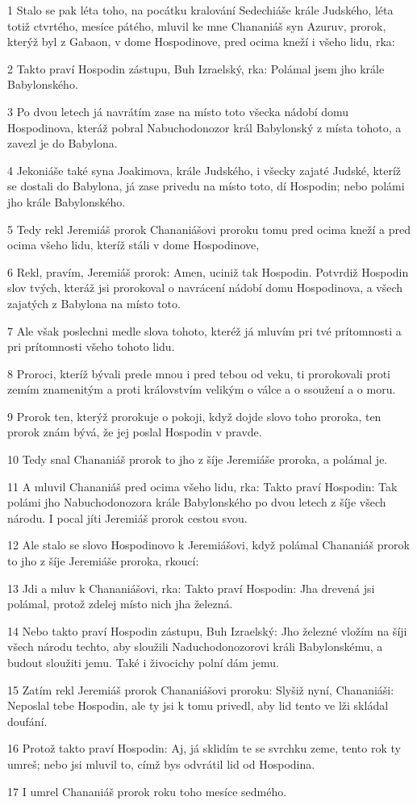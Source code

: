 \par 1 Stalo se pak léta toho, na pocátku kralování Sedechiáše krále Judského, léta totiž ctvrtého, mesíce pátého, mluvil ke mne Chananiáš syn Azuruv, prorok, kterýž byl z Gabaon, v dome Hospodinove, pred ocima kneží i všeho lidu, rka:
\par 2 Takto praví Hospodin zástupu, Buh Izraelský, rka: Polámal jsem jho krále Babylonského.
\par 3 Po dvou letech já navrátím zase na místo toto všecka nádobí domu Hospodinova, kteráž pobral Nabuchodonozor král Babylonský z místa tohoto, a zavezl je do Babylona.
\par 4 Jekoniáše také syna Joakimova, krále Judského, i všecky zajaté Judské, kteríž se dostali do Babylona, já zase privedu na místo toto, dí Hospodin; nebo polámi jho krále Babylonského.
\par 5 Tedy rekl Jeremiáš prorok Chananiášovi proroku tomu pred ocima kneží a pred ocima všeho lidu, kteríž stáli v dome Hospodinove,
\par 6 Rekl, pravím, Jeremiáš prorok: Amen, uciniž tak Hospodin. Potvrdiž Hospodin slov tvých, kteráž jsi prorokoval o navrácení nádobí domu Hospodinova, a všech zajatých z Babylona na místo toto.
\par 7 Ale však poslechni medle slova tohoto, kteréž já mluvím pri tvé prítomnosti a pri prítomnosti všeho tohoto lidu.
\par 8 Proroci, kteríž bývali prede mnou i pred tebou od veku, ti prorokovali proti zemím znamenitým a proti královstvím velikým o válce a o ssoužení a o moru.
\par 9 Prorok ten, kterýž prorokuje o pokoji, když dojde slovo toho proroka, ten prorok znám bývá, že jej poslal Hospodin v pravde.
\par 10 Tedy snal Chananiáš prorok to jho z šíje Jeremiáše proroka, a polámal je.
\par 11 A mluvil Chananiáš pred ocima všeho lidu, rka: Takto praví Hospodin: Tak polámi jho Nabuchodonozora krále Babylonského po dvou letech z šíje všech národu. I pocal jíti Jeremiáš prorok cestou svou.
\par 12 Ale stalo se slovo Hospodinovo k Jeremiášovi, když polámal Chananiáš prorok to jho z šíje Jeremiáše proroka, rkoucí:
\par 13 Jdi a mluv k Chananiášovi, rka: Takto praví Hospodin: Jha drevená jsi polámal, protož zdelej místo nich jha železná.
\par 14 Nebo takto praví Hospodin zástupu, Buh Izraelský: Jho železné vložím na šíji všech národu techto, aby sloužili Naduchodonozorovi králi Babylonskému, a budout sloužiti jemu. Také i živocichy polní dám jemu.
\par 15 Zatím rekl Jeremiáš prorok Chananiášovi proroku: Slyšiž nyní, Chananiáši: Neposlal tebe Hospodin, ale ty jsi k tomu privedl, aby lid tento ve lži skládal doufání.
\par 16 Protož takto praví Hospodin: Aj, já sklidím te se svrchku zeme, tento rok ty umreš; nebo jsi mluvil to, címž bys odvrátil lid od Hospodina.
\par 17 I umrel Chananiáš prorok roku toho mesíce sedmého.


